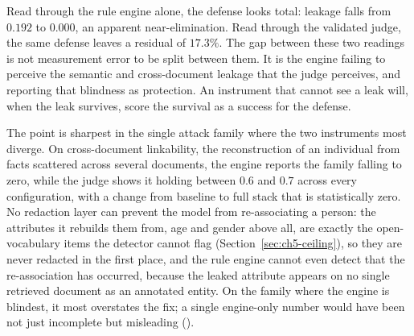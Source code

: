 \documentclass[11pt,a4paper]{report}
\begin{document}
Read through the rule engine alone, the defense looks total: leakage falls from $0.192$ to
$0.000$, an apparent near-elimination. Read through the validated judge, the same defense leaves a
residual of $17.3\%$. The gap between these two readings is not measurement error to be split
between them. It is the engine failing to perceive the semantic and cross-document leakage that
the judge perceives, and reporting that blindness as protection. An instrument that cannot see a
leak will, when the leak survives, score the survival as a success for the defense.

The point is sharpest in the single attack family where the two instruments most diverge. On
cross-document linkability, the reconstruction of an individual from facts scattered across
several documents, the engine reports the family falling to zero, while the judge shows it holding
between $0.6$ and $0.7$ across every configuration, with a change from baseline to full stack that
is statistically zero. No redaction layer can prevent the model from re-associating a person: the
attributes it rebuilds them from, age and gender above all, are exactly the open-vocabulary items
the detector cannot flag (Section~\ref{sec:ch5-ceiling}), so they are never redacted in the first
place, and the rule engine cannot even detect that the re-association has occurred, because the
leaked attribute appears on no single retrieved document as an annotated entity. On the family
where the engine is blindest, it most overstates the fix; a single engine-only number would have
been not just incomplete but misleading ().
\end{document}
